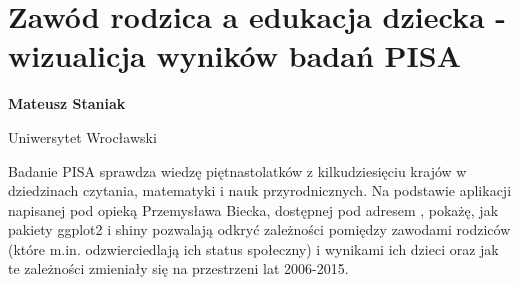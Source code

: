 \documentclass[\main/boa.tex]{subfiles}
\begin{document}
\section{Zawód rodzica a edukacja dziecka - wizualicja wyników badań PISA}

\begin{minipage}{0.915\textwidth}
	\centering
  {\bf {} Mateusz Staniak}
\end{minipage}



\begin{affiliations}
\begin{minipage}{0.915\textwidth}
\centering
Uniwersytet Wrocławski \\[-2pt]
\end{minipage}
\end{affiliations}

\vskip 0.3cm

 Badanie PISA sprawdza wiedzę piętnastolatków z kilkudziesięciu krajów w dziedzinach czytania, matematyki i nauk przyrodnicznych. Na podstawie aplikacji napisanej pod opieką Przemysława Biecka, dostępnej pod adresem , pokażę, jak pakiety ggplot2 i shiny pozwalają odkryć zależności pomiędzy zawodami rodziców (które m.in. odzwierciedlają ich status społeczny) i wynikami ich dzieci oraz jak te zależności zmieniały się na przestrzeni lat 2006-2015.
\end{document}
